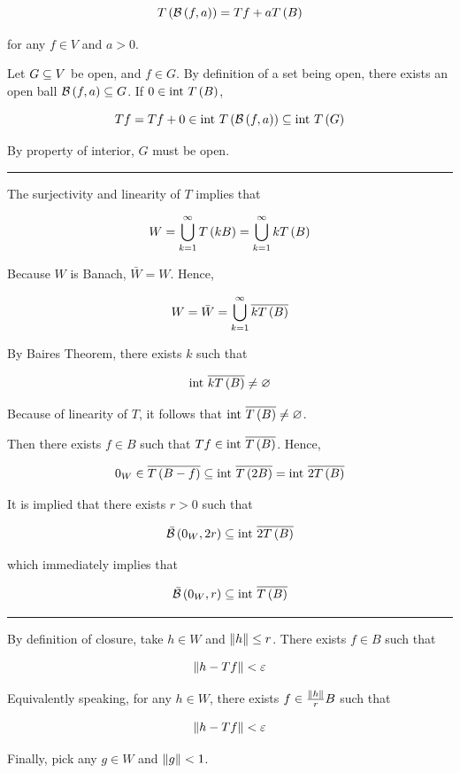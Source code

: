 \documentclass[
]{article}
\begin{document}
\[T\left(\mathcal B\left(f,a\right)\right) = Tf+aT\left(B\right)\]

for any \(f\in V\) and \(a>0\).

Let \(G\subseteq V\) be open, and \(f\in G\). By definition of a set being
open, there exists an open ball \(\mathcal B\left(f,a\right)\subseteq G\). If
\(0\in \text{int }T\left(B\right)\),

\[Tf = Tf+0 \in \text{int }T\left(\mathcal B\left(f,a\right)\right)\subseteq \text{int }T\left(G\right)\]

By property of interior, \(G\) must be open.

\begin{center}\rule{0.5\linewidth}{0.5pt}\end{center}

The surjectivity and linearity of \(T\) implies that

\[\begin{aligned}
W = \bigcup_{{k} = 1}^{\infty} T\left(kB\right) = \bigcup_{{k} = 1}^{\infty} kT\left(B\right)
\end{aligned}\]

Because \(W\) is Banach, \(\bar W = W\). Hence,

\[W = \bar W = \bigcup_{{k} = 1}^{\infty} \overline{kT\left(B\right)}\]

By Baire\textquotesingle s Theorem, there exists \(k\) such that

\[\text{int }\overline{kT\left(B\right)}\ne \varnothing\]

Because of linearity of \(T\), it follows that
\(\text{int }\overline{T\left(B\right)}\ne\varnothing\).

Then there exists \(f\in B\) such that
\(Tf\in \text{int }\overline{T\left(B\right)}\). Hence,

\[0_W\in \overline{T\left(B-f\right)}\subseteq \text{int }\overline{T\left(2B\right)} = \text{int }\overline{2T\left(B\right)}\]

It is implied that there exists \(r>0\) such that

\[\bar{\mathcal B}\left(0_W,2r\right)\subseteq \text{int }\overline{2T\left(B\right)}\]

which immediately implies that

\[\bar{\mathcal B}\left(0_W,r\right)\subseteq \text{int }\overline{T\left(B\right)}\]

\begin{center}\rule{0.5\linewidth}{0.5pt}\end{center}

By definition of closure, take \(h\in W\) and \(\|{h}\|\le r\). There
exists \(f\in B\) such that

\[\|{h-Tf}\|<\varepsilon\]

Equivalently speaking, for any \(h\in W\), there exists
\(f\in \frac{\|{h}\|}{r}B\) such that

\[\|{h-Tf}\|<\varepsilon\]

Finally, pick any \(g\in W\) and \(\|{g}\|<1\).
\end{document}
